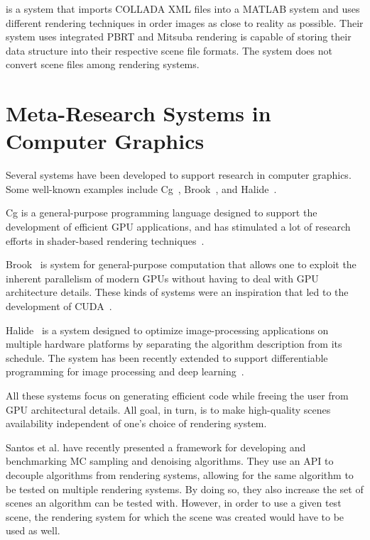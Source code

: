 \cite{rendertoolbox} is a system that imports COLLADA XML files into a MATLAB system and uses different rendering techniques in order images as close to 
reality as possible. Their system uses integrated PBRT and Mitsuba rendering is capable of storing their data structure into their respective scene file 
formats. The system does not convert scene files among rendering systems. 

\section{Meta-Research Systems in Computer Graphics}

Several systems have been developed to support research in computer graphics. Some well-known examples include Cg~\cite{Mark2003}, Brook~\cite{Buck2004}, and Halide~\cite{Ragan-Kelley2012}.

Cg is a general-purpose programming language designed to support the development of efficient GPU applications, and has stimulated a lot of research efforts in shader-based rendering techniques~\cite{Policarpo2005, Policarpo2006, Wyman2005, Oliveira2007RRT}.  

Brook~\cite{Buck2004} is system for general-purpose computation that allows one to exploit the inherent parallelism of modern GPUs without having to deal with GPU architecture details. These kinds of systems were an inspiration that led to the development of CUDA~\cite{Nickolls2008}.

Halide~\cite{Ragan-Kelley2012} is a system designed to optimize image-processing applications on multiple hardware platforms by separating the algorithm description from its schedule. The system has been recently extended to support differentiable programming for image processing and deep learning~\cite{Li2018-Halide-Diff_Prog}. 

All these systems focus on generating efficient code while freeing the user from GPU architectural details. All goal, in turn, is to make high-quality scenes availability independent of one's choice of rendering system. 

Santos et al. have recently presented a framework for developing and benchmarking MC sampling and denoising algorithms. They use an API to decouple algorithms from rendering systems, allowing for the same algorithm to be tested on multiple rendering systems. By doing so, they also increase the set of scenes an algorithm can be tested with. However, in order to use a given test scene, the rendering system for which the scene was created would have to be used as well. 

